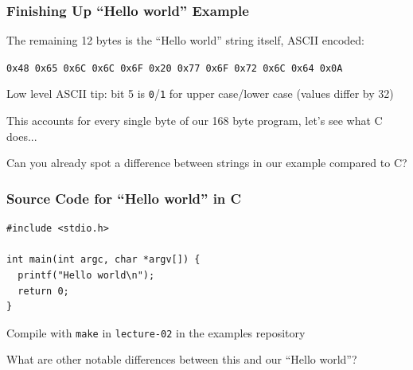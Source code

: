   \begin{frame}
    \frametitle{Finishing Up ``Hello world'' Example}

    The remaining 12 bytes is the ``Hello world'' string itself, ASCII encoded:
    
    \texttt{\footnotesize 0x48 0x65 0x6C 0x6C 0x6F 0x20 0x77 0x6F 0x72 0x6C 0x64 0x0A}

    \vspace{2em}

    \hspace{2em} Low level ASCII tip: bit 5 is \texttt{0}/\texttt{1} for upper
    case/lower case (values differ by 32)

    \vspace{2em}

    This accounts for every single byte of our 168 byte program, let's see what
    C does...

    \vspace{2em}
    Can you already spot a difference between strings in our example compared to
    C?
  \end{frame}

  \begin{frame}[fragile]
    \frametitle{Source Code for ``Hello world'' in C}

    \begin{lstlisting}
#include <stdio.h>

int main(int argc, char *argv[]) {
  printf("Hello world\n");
  return 0;
}
    \end{lstlisting}

    Compile with \lstinline|make| in \lstinline|lecture-02| in the examples
    repository

    \vspace{2em}

    What are other notable differences between this and our ``Hello world''?
  \end{frame}

